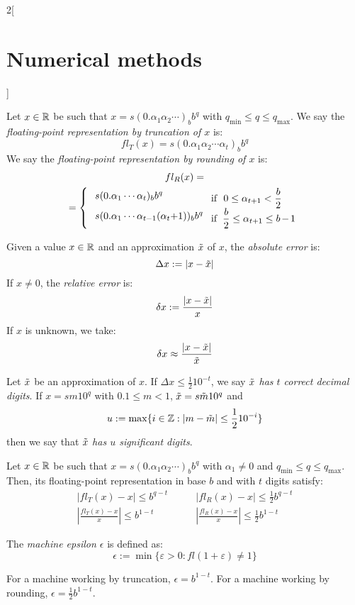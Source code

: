 \documentclass[../../../main.tex]{subfiles}
\begin{document}
\begin{multicols}{2}[\section{Numerical methods}]
\begin{table}[ht]
    \label{tab:my_label}
\end{table}
\begin{definition}
    Let $x\in\mathbb{R}$ be such that $x=s(0.\alpha_1\alpha_2\cdots)_bb^q$ with $q_\text{min}\leq q\leq q_\text{max}$. We say the \textit{floating-point representation by truncation of $x$} is: $$fl_T(x)=s(0.\alpha_1\alpha_2\cdots\alpha_t)_bb^q$$ We say the \textit{floating-point representation by rounding of $x$} is:
    \begin{multline*}
        fl_R(x)=\\=\left\{\text{\setlength{\tabcolsep}{4pt}
        \begin{tabular}{m{3.85cm}m{3cm}}
            $s(0.\alpha_1\cdots\alpha_t)_bb^q$ & if $\ 0\leq\alpha_{t+1}<\frac{b}{2}$\\
            $s(0.\alpha_1\cdots\alpha_{t-1}(\alpha_t+1))_bb^q$ & if $\ \frac{b}{2}\leq\alpha_{t+1}\leq b-1$
        \end{tabular}}\right.
    \end{multline*}
\end{definition}
\begin{definition}
    Given a value $x\in\mathbb{R}$ and an approximation $\Tilde{x}$ of $x$, the \textit{absolute error} is: $$\Delta x:=|x-\Tilde{x}|$$ If $x\ne 0$, the \textit{relative error} is: $$\delta x:=\frac{|x-\Tilde{x}|}{x}$$ If $x$ is unknown, we take: $$\delta x\approx\frac{|x-\Tilde{x}|}{\Tilde{x}}$$
\end{definition}
\begin{definition}
    Let $\Tilde{x}$ be an approximation of $x$. If $\Delta x\leq\frac{1}{2}10^{-t}$, we say \textit{$\Tilde{x}$ has $t$ correct decimal digits}. If $x=sm10^q$ with $0.1\leq m<1$, $\Tilde{x}=s\Tilde{m}10^q$ and $$u:=\max\{i\in\mathbb{Z}:|m-\Tilde{m}|\leq\frac{1}{2}10^{-i}\}$$ then we say that $\Tilde{x}$ \textit{has $u$ significant digits}.
\end{definition}
\begin{prop}
    Let $x\in\mathbb{R}$ be such that $x=s(0.\alpha_1\alpha_2\cdots)_bb^q$ with $\alpha_1\ne0$ and $q_\text{min}\leq q\leq q_\text{max}$. Then, its floating-point representation in base $b$ and with $t$ digits satisfy:
    \begin{align*}
        \left|fl_T(x)-x\right|\leq b^{q-t}\quad&\quad \left|fl_R(x)-x\right|\leq\frac{1}{2}b^{q-t}\\
        \left|\frac{fl_T(x)-x}{x}\right|\leq b^{1-t}\quad&\quad \left|\frac{fl_R(x)-x}{x}\right|\leq\frac{1}{2}b^{1-t}
    \end{align*}
\end{prop}
\begin{definition}
    The \textit{machine epsilon $\epsilon$} is defined as: $$\epsilon:=\min\{\varepsilon>0:fl(1+\varepsilon)\ne 1\}$$
\end{definition}
\begin{prop}
    For a machine working by truncation, $\epsilon=b^{1-t}$. For a machine working by rounding, $\epsilon=\frac{1}{2}b^{1-t}$.
\end{prop}

\end{multicols}
\end{document}
